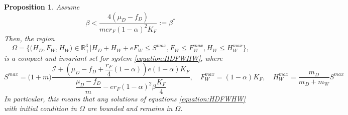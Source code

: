 \documentclass{article}
\newcommand{\cI}{\mathcal{I}}
\newtheorem{prop}{Proposition}
\begin{document}
\begin{prop}\label{prop:invariantRegion} 
Assume 
\begin{equation*}
\beta < \dfrac{4(\mu_D - f_D)}{m e r_F (1-\alpha)^2 K_F} := \beta^*
\end{equation*}
Then, the region
$$\Omega = \Big\{\Big(H_D, F_W, H_W \Big) \in \mathbb{R}_+^3  \Big|H_D + H_W + eF_W \leq S^{max}, F_W \leq F_W^{max}, H_W \leq H_W^{max} \Big\},$$
is a compact and invariant set for system \eqref{equation:HDFWHW}, 
where
$$
S^{max} = \Big(1 + m \Big) \dfrac{\cI + \left(\mu_D - f_D + \dfrac{r_F}{4}(1-\alpha) \right) e (1-\alpha)K_F }{\dfrac{\mu_D - f_D}{m} - er_F (1-\alpha)^2 \beta \dfrac{K_F}{4}},
\quad
F_W^{max} = (1-\alpha)K_F,
\quad
H_W^{max} = \dfrac{m_D}{m_D + m_W} S^{max}
$$
In particular, this means that any solutions of equations \eqref{equation:HDFWHW} with initial condition in $\Omega$ are bounded and remains in $\Omega$.
\end{prop}
%
\end{document}
